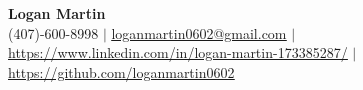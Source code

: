 \documentclass[letterpaper,10pt]{article}
\begin{document}
\begin{center}
    \textbf{\Huge Logan Martin} \\ \vspace{1pt}
		\small (407)-600-8998 $|$
    \small \href{mailto:loganmartin0602@gmail.com}{\underline{loganmartin0602@gmail.com}} $|$ 
    \href{https://www.linkedin.com/in/logan-martin-173385287/}{\underline{https://www.linkedin.com/in/logan-martin-173385287/}} $|$
    \href{https://github.com/loganmartin0602}{\underline{https://github.com/loganmartin0602}}
\end{center}


%



\end{document}
